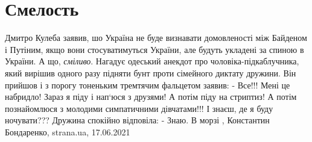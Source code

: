  
 
 
 
 
\chapter{Смелость}
\label{sec:slova.smelost}

Дмитро Кулеба заявив, шо Україна не буде визнавати домовленості між Байденом і
Путіним, якщо вони стосуватимуться України, але будуть укладені за спиною в
України.  А що, \emph{сміливо}. Нагадує одеський анекдот про
чоловіка-підкаблучника, який вирішив одного разу підняти бунт проти сімейного
диктату дружини. Він прийшов і з порогу тоненьким тремтячим фальцетом заявив: -
Все!!! Мені це набридло! Зараз я піду і нап‘юся з друзями! А потім піду на
стриптиз! А потім познайомлюся з молодими симпатичними дівчатами!!! І знаєш, де
я буду ночувати???  Дружина спокійно відповіла: - Знаю. В морзі
, 
Константин Бондаренко, strana.ua, 17.06.2021


